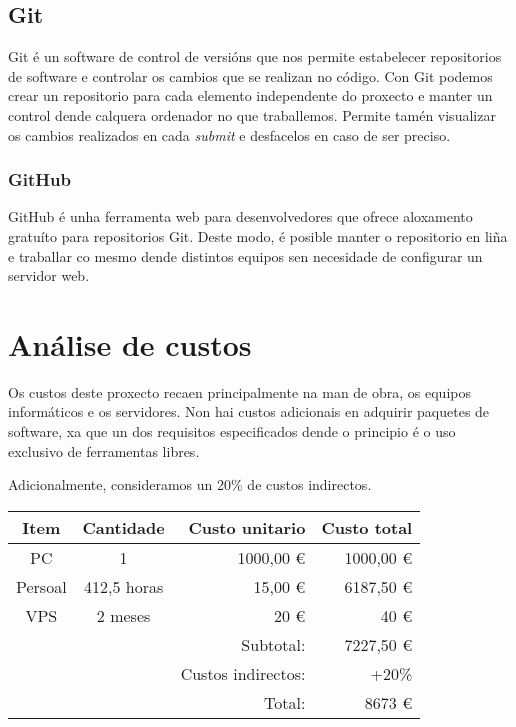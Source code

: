 \subsection{Git}
Git \cite{git} é un software de control de versións que nos permite estabelecer
repositorios de software e controlar os cambios que se realizan no código. Con
Git podemos crear un repositorio para cada elemento independente do proxecto e
manter un control dende calquera ordenador no que traballemos. Permite tamén
visualizar os cambios realizados en cada {\it submit} e desfacelos en caso de
ser preciso.
\subsubsection{GitHub}
GitHub é unha ferramenta web para desenvolvedores que ofrece aloxamento gratuíto
para repositorios Git. Deste modo, é posible manter o repositorio en liña e
traballar co mesmo dende distintos equipos sen necesidade de configurar un
servidor web.

\section{Análise de custos}
Os custos deste proxecto recaen principalmente na man de obra, os equipos
informáticos e os servidores. Non hai custos adicionais en adquirir paquetes de
software, xa que un dos requisitos especificados dende o principio é o uso
exclusivo de ferramentas libres.
\par
Adicionalmente, consideramos un 20\% de custos indirectos.

\begin{tabular} { | c c r | r | }
\hline
Item & Cantidade & Custo unitario & Custo total \\
\hline
PC & 1 & 1000,00 \euro{} & 1000,00 \euro{} \\
\hline
Persoal & 412,5 horas & 15,00 \euro{} & 6187,50 \euro{} \\
\hline
VPS & 2 meses & 20 \euro{} & 40 \euro{} \\
\hline
& & Subtotal: & 7227,50 \euro{} \\
\hline
&& Custos indirectos: & +20\% \\
\hline
&& Total: & 8673 \euro{} \\
\hline
\end{tabular}